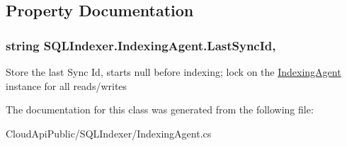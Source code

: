 \subsection{Property Documentation}
\hypertarget{class_s_q_l_indexer_1_1_indexing_agent_a28454d94bac1c6abe5e7ece3b56c8b00}{
\subsubsection[{Last\-Sync\-Id}]{\setlength{\rightskip}{0pt plus 5cm}string S\-Q\-L\-Indexer.\-Indexing\-Agent.\-Last\-Sync\-Id\hspace{0.3cm}{\ttfamily [get]}, {\ttfamily [set]}}}\label{class_s_q_l_indexer_1_1_indexing_agent_a28454d94bac1c6abe5e7ece3b56c8b00}


Store the last Sync Id, starts null before indexing; lock on the \hyperlink{class_s_q_l_indexer_1_1_indexing_agent}{Indexing\-Agent} instance for all reads/writes 



The documentation for this class was generated from the following file\-:\begin{DoxyCompactItemize}
\item 
Cloud\-Api\-Public/\-S\-Q\-L\-Indexer/Indexing\-Agent.\-cs\end{DoxyCompactItemize}

